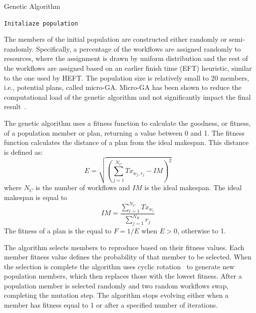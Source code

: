 \begin{algorithm}[ht]
    \caption{Genetic Algorithm}
    \label{alg:gen_algo}
    \begin{algorithmic}[1]
        \State \texttt{Initaliaze population}
        \EndWhile
        \EndProcedure
    \end{algorithmic}
\end{algorithm}

The members of the initial population are constructed either randomly or semi-randomly.
Specifically, a percentage of the workflows are assigned randomly to resources, where the assignment is drawn by uniform distribution and the rest of the workflows are assigned based on an earlier finish time (EFT) heuristic, similar to the one used by HEFT.
The population size is relatively small to 20 members, i.e., potential plans, called micro-GA.
Micro-GA has been shown to reduce the computational load of the genetic algorithm and not significantly impact the final result~\cite{zomaya2001observations}.

The genetic algorithm uses a fitness function to calculate the goodness, or fitness, of a population member or plan, returning a value between 0 and 1.
The fitness function calculates the distance of a plan from the ideal makespan.
This distance is defined as:
\begin{equation}
E = \sqrt{(\sum_{j=1}^{N_{C}}Tx_{w_{j},r_{j}} - IM)^2}
\label{eq:fitness}
\end{equation}
where $N_{C}$ is the number of workflows and $IM$ is the ideal makespan.
The ideal makespan is equal to
\begin{equation}
IM = \frac{\sum_{i=1}^{N_{C}}Tx_{w_{i}}}{\sum_{j=1}^{N_{R}}r_{j}}
\label{eq:ideal_fitness}
\end{equation}
The fitness of a plan is the equal to $F = 1 /E$ when $E > 0$, otherwise to 1.

The algorithm selects members to reproduce based on their fitness values.
Each member fitness value defines the probability of that member to be selected.
When the selection is complete the algorithm uses cyclic rotation~\cite{oliver1987study} to generate new population members, which then replaces those with the lowest fitness.
After a population member is selected randomly and two random workflows swap, completing the mutation step.
The algorithm stops evolving either when a member has fitness equal to 1 or after a specified number of iterations.

